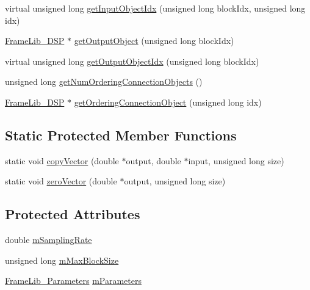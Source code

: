 \begin{DoxyCompactItemize}
\item 
virtual unsigned long \hyperlink{class_frame_lib___d_s_p_a6da5977366587bbab7532a8d4ab7d2f5}{get\+Input\+Object\+Idx} (unsigned long block\+Idx, unsigned long idx)
\item 
\hyperlink{class_frame_lib___d_s_p}{Frame\+Lib\+\_\+\+D\+SP} $\ast$ \hyperlink{class_frame_lib___d_s_p_afdf6c94e0cef2f714bdfd90aea517faf}{get\+Output\+Object} (unsigned long block\+Idx)
\item 
virtual unsigned long \hyperlink{class_frame_lib___d_s_p_a9eedfc5c69502c9bea3a0c1586a3ac57}{get\+Output\+Object\+Idx} (unsigned long block\+Idx)
\item 
unsigned long \hyperlink{class_frame_lib___d_s_p_a5a36587f32b2f7a49e0737934dc8a59b}{get\+Num\+Ordering\+Connection\+Objects} ()
\item 
\hyperlink{class_frame_lib___d_s_p}{Frame\+Lib\+\_\+\+D\+SP} $\ast$ \hyperlink{class_frame_lib___d_s_p_a8ecd5acbe59bf34b514c6e3b73cb518c}{get\+Ordering\+Connection\+Object} (unsigned long idx)
\end{DoxyCompactItemize}
\subsection*{Static Protected Member Functions}
\begin{DoxyCompactItemize}
\item 
static void \hyperlink{class_frame_lib___d_s_p_aaa7b3e5f55db4a6cf13d37958f08b17f}{copy\+Vector} (double $\ast$output, double $\ast$input, unsigned long size)
\item 
static void \hyperlink{class_frame_lib___d_s_p_a9da9216b727050afef88ff8e1ec01ba0}{zero\+Vector} (double $\ast$output, unsigned long size)
\end{DoxyCompactItemize}
\subsection*{Protected Attributes}
\begin{DoxyCompactItemize}
\item 
double \hyperlink{class_frame_lib___d_s_p_ad638dccde211f80eedca3d898f2c6ff6}{m\+Sampling\+Rate}
\item 
unsigned long \hyperlink{class_frame_lib___d_s_p_a92c6d7101aee042e778fc8e09d5c8f77}{m\+Max\+Block\+Size}
\item 
\hyperlink{class_frame_lib___parameters}{Frame\+Lib\+\_\+\+Parameters} \hyperlink{class_frame_lib___d_s_p_a01fec01b8ecbf2a80b98f989a568105c}{m\+Parameters}
\end{DoxyCompactItemize}
